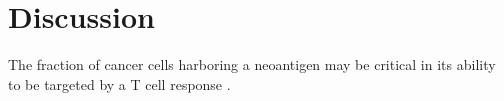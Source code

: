 \section*{Discussion}

The fraction of cancer cells harboring a neoantigen may be critical in its ability to be targeted by a T cell response \cite{McGranahan_2016}.

